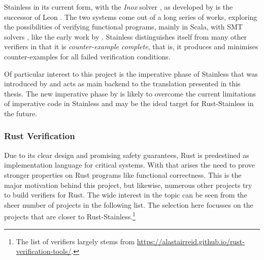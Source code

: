 Stainless in its current form, with the \emph{Inox} solver \cite{inox}, as
developed by \citet*{stainless} is the successor of Leon \cite{leon}. The two
systems come out of a long series of works, exploring the possibilities of
verifying functional programs, mainly in Scala, with SMT solvers \cite{smt},
like the early work by \citet{smrp}. Stainless distinguishes itself from many
other verifiers in that it is \emph{counter-example complete}, that is, it
produces and minimises counter-examples for all failed verification conditions.

Of particular interest to this project is the imperative phase of Stainless that
was introduced by \citet{regb} and acts as main backend to the translation
presented in this thesis. The new imperative phase by \citet{new-imperative} is
likely to overcome the current limitations of imperative code in Stainless and
may be the ideal target for Rust-Stainless in the future.

\subsubsection{Rust Verification}

Due to its clear design and promising safety guarantees, Rust is predestined as
implementation language for critical systems. With that arises the need to prove
stronger properties on Rust programs like functional correctness. This is the
major motivation behind this project, but likewise, numerous other projects try
to build verifiers for Rust. The wide interest in the topic can be seen from the
sheer number of projects in the following list. The selection here focusses on
the projects that are closer to Rust-Stainless.\footnote{The list of verifiers
largely stems from
\url{https://alastairreid.github.io/rust-verification-tools/}.}

